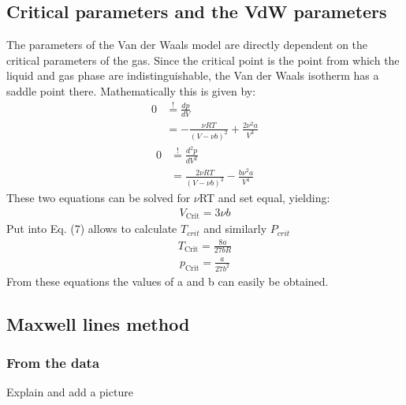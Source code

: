 \documentclass[a4paper,10pt,twocolumn]{article}
\begin{document}
    \subsection{Critical parameters and the VdW parameters}\label{subsec:criticalParams}
    The parameters of the Van der Waals model are directly dependent on the critical parameters of the gas.
    Since the critical point is the point from which the liquid and gas phase are indistinguishable, the Van der Waals isotherm has a saddle point there.
    Mathematically this is given by:
    \begin{equation}\label{eq:anh1}
    \begin{split}
        0 & \overset{!}{=}\frac{dp}{dV}\\
        & =-\frac{\nu R T}{(V-\nu b)^2}+\frac{2 \nu^2 a}{V^3}
    \end{split}
    \end{equation}
\begin{equation}\label{eq:anh2}
\begin{split}
    0 & \overset{!}{=}\frac{d^2p}{dV^2}\\
    & =\frac{2 \nu R T}{(V-\nu b)^3}-\frac{b \nu^2 a}{V^4}
\end{split}
\end{equation}
These two equations can be solved for $\nu$RT and set equal, yielding:
\begin{align}
    V_\text{Crit} = 3\nu b
\end{align}
Put into Eq. (7) allows to calculate $T_{crit}$ and similarly $P_{crit}$
\begin{align}
    T_\text{Crit}=\frac{8a}{27bR}
\end{align}
\begin{align}
    p_\text{Crit}=\frac{a}{27b^2}
\end{align}
    From these equations the values of a and b can easily be obtained.
    \subsection{Maxwell lines method}\label{subsec:maxwellMethod}
    \subsubsection{From the data}\label{subsubsec:maxwellFormData}
    Explain and add a picture
\end{document}
